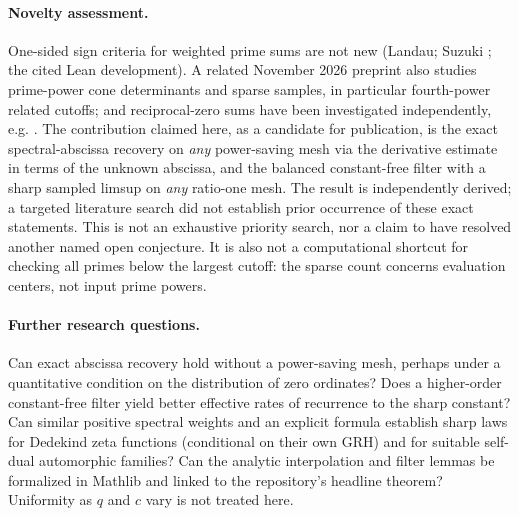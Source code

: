 \documentclass[11pt]{article}
\theoremstyle{remark}\newtheorem{remark}[theorem]{Remark}
\begin{document}
\paragraph{Novelty assessment.} One-sided sign criteria for weighted prime sums are not new (Landau; Suzuki \cite{suzuki}; the cited Lean development). A related November 2026 preprint \cite{polak} also studies prime-power cone determinants and sparse samples, in particular fourth-power related cutoffs; and reciprocal-zero sums have been investigated independently, e.g. \cite{reciprocal}. The contribution claimed here, as a candidate for publication, is the exact spectral-abscissa recovery on \emph{any} power-saving mesh via the derivative estimate in terms of the unknown abscissa, and the balanced constant-free filter with a sharp sampled limsup on \emph{any} ratio-one mesh. The result is independently derived; a targeted literature search did not establish prior occurrence of these exact statements. This is not an exhaustive priority search, nor a claim to have resolved another named open conjecture. It is also not a computational shortcut for checking all primes below the largest cutoff: the sparse count concerns evaluation centers, not input prime powers.

\paragraph{Further research questions.} Can exact abscissa recovery hold without a power-saving mesh, perhaps under a quantitative condition on the distribution of zero ordinates? Does a higher-order constant-free filter yield better effective rates of recurrence to the sharp constant? Can similar positive spectral weights and an explicit formula establish sharp laws for Dedekind zeta functions (conditional on their own GRH) and for suitable self-dual automorphic families? Can the analytic interpolation and filter lemmas be formalized in Mathlib and linked to the repository's headline theorem? Uniformity as $q$ and $c$ vary is not treated here.
\end{document}
